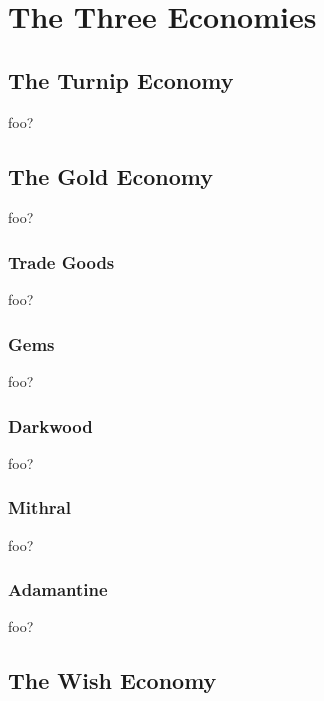 \section{The Three Economies}

\subsection{The Turnip Economy}

foo?

\subsection{The Gold Economy}

foo?

\subsubsection{Trade Goods}

foo?

\subsubsection{Gems}

foo?

\subsubsection{Darkwood}

foo?

\subsubsection{Mithral}

foo?

\subsubsection{Adamantine}

foo?

\subsection{The Wish Economy}

